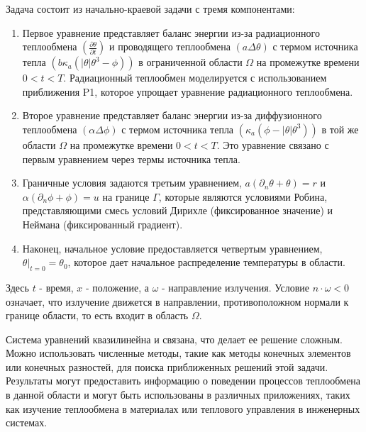 Задача состоит из начально-краевой задачи с тремя компонентами:

\begin{enumerate}
    \item Первое уравнение представляет баланс энергии из-за радиационного
    теплообмена $\left(\frac{\partial \theta}{\partial t}\right)$ и проводящего
    теплообмена $(a \Delta \theta)$ с термом источника тепла
    $\left(b \kappa_a \left(|\theta| \theta^3 - \phi \right)\right)$
    в ограниченной области $\Omega$ на промежутке времени $0 < t < T$.
    Радиационный теплообмен моделируется с использованием приближения P1,
    которое упрощает уравнение радиационного теплообмена.

    \item Второе уравнение представляет баланс энергии из-за диффузионного
    теплообмена $(\alpha \Delta \phi)$ с термом источника тепла
    $\left(\kappa_a \left(\phi - |\theta| \theta^3 \right)\right)$
    в той же области $\Omega$ на промежутке времени $0 < t < T$.
    Это уравнение связано с первым уравнением через термы источника тепла.

    \item Граничные условия задаются третьим уравнением,
    $a(\partial_n \theta + \theta) = r$ и $\alpha(\partial_n \phi + \phi) = u$
    на границе $\Gamma$, которые являются условиями Робина,
    представляющими смесь условий Дирихле
    (фиксированное значение) и Неймана (фиксированный градиент).

    \item Наконец, начальное условие предоставляется четвертым уравнением,
    $\theta|_{t=0} = \theta_0$, которое дает начальное
    распределение температуры в области.

\end{enumerate}

Здесь $t$ - время, $x$ - положение, а $\omega$ - направление излучения.
Условие $n \cdot \omega < 0$ означает, что излучение движется в направлении,
противоположном нормали к границе области, то есть входит в область $\Omega$.

Система уравнений квазилинейна и связана, что делает ее решение сложным.
Можно использовать численные методы, такие как методы конечных элементов
или конечных разностей, для поиска приближенных решений этой задачи.
Результаты могут предоставить информацию о поведении процессов теплообмена
в данной области и могут быть использованы в различных приложениях,
таких как изучение теплообмена в материалах или теплового управления
в инженерных системах.

